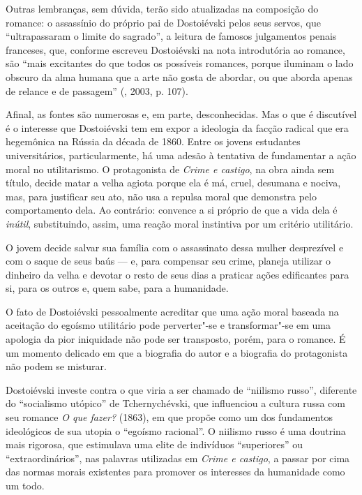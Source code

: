 Outras lembranças, sem dúvida, terão sido atualizadas na composição do
romance: o assassínio do próprio pai de Dostoiévski pelos seus servos,
que ``ultrapassaram o limite do sagrado'', a leitura de famosos
julgamentos penais franceses, que, conforme escreveu Dostoiévski na nota
introdutória ao romance, são ``mais excitantes do que todos os possíveis
romances, porque iluminam o lado obscuro da alma humana que a arte não
gosta de abordar, ou que aborda apenas de relance e de passagem'' (, 2003, p. 107).

Afinal, as fontes são numerosas e, em parte, desconhecidas. Mas o que é
discutível é o interesse que Dostoiévski tem em expor a ideologia da
facção radical que era hegemônica na Rússia da década de 1860. Entre os
jovens estudantes universitários, particularmente, há uma adesão à
tentativa de fundamentar a ação moral no utilitarismo. O protagonista de
\emph{Crime e castigo}, na obra ainda sem título, decide matar a velha
agiota porque ela é má, cruel, desumana e nociva, mas, para justificar
seu ato, não usa a repulsa moral que demonstra pelo comportamento dela.
Ao contrário: convence a si próprio de que a vida dela é \emph{inútil},
substituindo, assim, uma reação moral instintiva por um critério
utilitário.

O jovem decide salvar sua família com o assassinato dessa mulher
desprezível e com o saque de seus baús --- e, para compensar seu crime,
planeja utilizar o dinheiro da velha e devotar o resto de seus dias a
praticar ações edificantes para si, para os outros e, quem sabe, para a
humanidade.

O fato de Dostoiévski pessoalmente acreditar que uma ação moral baseada
na aceitação do egoísmo utilitário pode perverter"-se e transformar"-se em
uma apologia da pior iniquidade não pode ser transposto, porém, para o
romance. É um momento delicado em que a biografia do autor e a
biografia do protagonista não podem se misturar.

Dostoiévski investe contra o que viria a ser chamado de ``niilismo
russo'', diferente do ``socialismo utópico'' de Tchernychévski, que
influenciou a cultura russa com seu romance \emph{O que fazer?} (1863),
em que propõe como um dos fundamentos ideológicos de sua utopia o
``egoísmo racional''. O niilismo russo é uma doutrina mais rigorosa, que
estimulava uma elite de indivíduos ``superiores'' ou
``extraordinários'', nas palavras utilizadas em \emph{Crime e castigo},
a passar por cima das normas morais existentes para promover os
interesses da humanidade como um todo.


